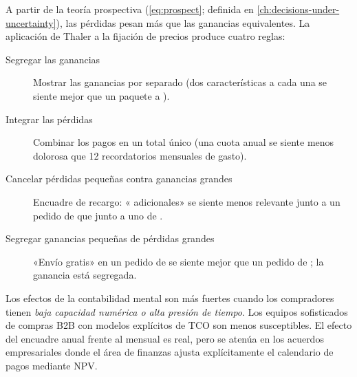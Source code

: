 A partir de la teoría prospectiva (\cref{eq:prospect}; definida en \cref{ch:decisions-under-uncertainty}), las pérdidas pesan más que las ganancias equivalentes. La aplicación de Thaler a la fijación de precios produce cuatro reglas:

\begin{description}
  \item[Segregar las ganancias] Mostrar las ganancias por separado (dos características a  cada una se siente mejor que un paquete a ).
  \item[Integrar las pérdidas] Combinar los pagos en un total único (una cuota anual se siente menos dolorosa que 12 recordatorios mensuales de gasto).
  \item[Cancelar pérdidas pequeñas contra ganancias grandes] Encuadre de recargo: « adicionales» se siente menos relevante junto a un pedido de  que junto a uno de .
  \item[Segregar ganancias pequeñas de pérdidas grandes] «Envío gratis» en un pedido de  se siente mejor que un pedido de ; la ganancia está segregada.
\end{description}

Los efectos de la contabilidad mental son más fuertes cuando los compradores tienen \emph{baja capacidad numérica o alta presión de tiempo}. Los equipos sofisticados de compras B2B con modelos explícitos de TCO son menos susceptibles. El efecto del encuadre anual frente al mensual es real, pero se atenúa en los acuerdos empresariales donde el área de finanzas ajusta explícitamente el calendario de pagos mediante NPV.

